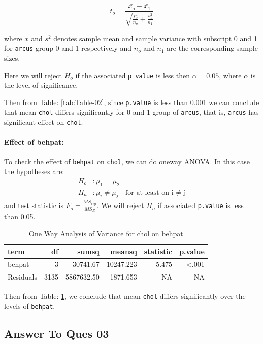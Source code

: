 \documentclass[
  12pt,
  oneside]{article}
\begin{document}
\[
t_o = \frac{\bar{x_o} - \bar{x_1}}{\sqrt{\frac{s_o^2}{n_o} + \frac{s_1^2}{n_1}}}
\]

where \(\bar{x}\) and \(s^2\) denotes sample mean and sample variance with subscript
0 and 1 for \texttt{arcus} group 0 and 1 respectively and \(n_o\) and \(n_1\) are the corresponding sample sizes.

Here we will reject \(H_o\) if the associated \texttt{p\ value} is less then \(\alpha = 0.05\), where \(\alpha\) is the level of significance.

Then from Table: \ref{tab:Table-02}, since \texttt{p.value} is less than 0.001 we can conclude that mean \texttt{chol} differs significantly for 0 and 1 group of \texttt{arcus}, that is, \texttt{arcus} has significant effect on \texttt{chol}.

\hypertarget{effect-of-behpat}{%
\paragraph{Effect of behpat:}\label{effect-of-behpat}}

To check the effect of \texttt{behpat} on \texttt{chol}, we can do oneway ANOVA. In this case the hypotheses are:
\begin{align*}
H_o&: \mu_1 = \mu_2 \\
H_a&: \mu_i \neq \mu_j \! &\text{for at least on i $\ne$ j}
\end{align*}
and test statistic is \(F_o = \frac{MS_{reg}}{MS_{E}}\). We will reject \(H_o\) if associated \texttt{p.value} is less than 0.05.

\begin{table}[H]

\caption{\label{tab:Table-03}One Way Analysis of Variance for chol on behpat}
\centering
\begin{tabular}[t]{lrrrrr}
\toprule
term & df & sumsq & meansq & statistic & p.value\\
\midrule
behpat & 3 & 30741.67 & 10247.223 & 5.475 & <.001\\
Residuals & 3135 & 5867632.50 & 1871.653 & NA & NA\\
\bottomrule
\end{tabular}
\end{table}

Then from Table: \ref{tab:Table-03}, we conclude that mean \texttt{chol} differs significantly over the levels of \texttt{behpat}.

\clearpage

\hypertarget{answer-to-ques-03}{%
\subsection{Answer To Ques 03}\label{answer-to-ques-03}}
\end{document}
